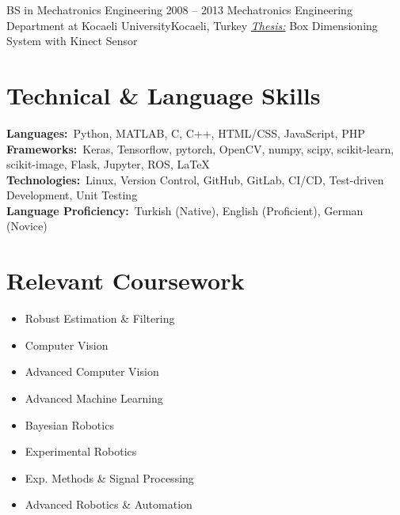 \documentclass[letterpaper,11pt]{article}
\begin{document}
	  \resumeSubheading
      {BS in Mechatronics Engineering}
	  {2008 -- 2013}
      {Mechatronics Engineering Department at Kocaeli University}{Kocaeli, Turkey}
	  \textit{\underline{Thesis:}} Box Dimensioning System with Kinect Sensor
  \resumeSubHeadingListEnd

\section{Technical \& Language Skills}
 \begin{itemize}[leftmargin=0.15in, label={}]
    \small{\item{
     \textbf{Languages:}{~Python, MATLAB, C, C++, HTML/CSS, JavaScript, PHP} \\
	 \textbf{Frameworks:}{~Keras, Tensorflow, pytorch, OpenCV, numpy, scipy, scikit-learn, scikit-image, Flask, Jupyter, ROS, \LaTeX} \\
     \textbf{Technologies:}{~Linux, Version Control, GitHub, GitLab, CI/CD, Test-driven Development, Unit Testing} \\
	 \textbf{Language Proficiency:}{~Turkish (Native), English (Proficient), German (Novice)}
    }}
 \end{itemize}
 \vspace{-16pt}

%
\section{Relevant Coursework}
	\begin{multicols}{2}
		\begin{itemize}[itemsep=-5pt, parsep=3pt]
			\item\small Robust Estimation \& Filtering
			\item Computer Vision
			\item Advanced Computer Vision
			\item Advanced Machine Learning
			\item Bayesian Robotics
			\item Experimental Robotics
			\item Exp. Methods \& Signal Processing
			\item Advanced Robotics \& Automation
		\end{itemize}
	\end{multicols}
	\vspace*{2.0\multicolsep}
\end{document}
